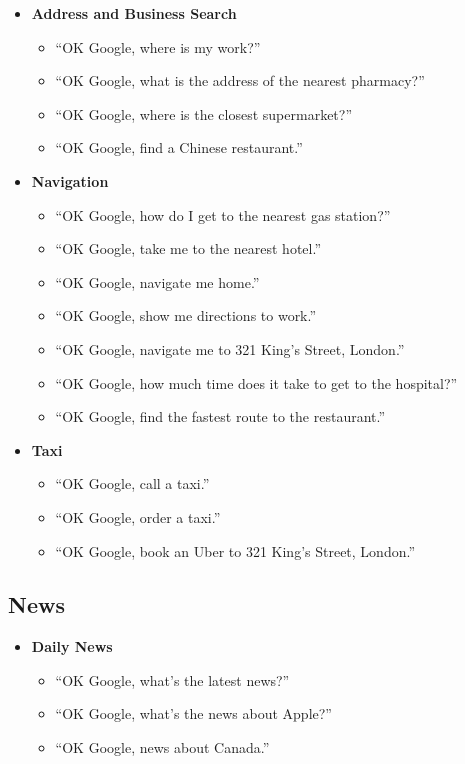 \documentclass[
  jou,
  floatsintext,
  longtable,
  a4paper,
  nolmodern,
  notxfonts,
  notimes,
  12pt,
  colorlinks=true,linkcolor=blue,citecolor=blue,urlcolor=blue]{apa7}
\providecommand{\tightlist}{%
  \setlength{\itemsep}{0pt}\setlength{\parskip}{0pt}}
\begin{document}
\begin{itemize}
\tightlist
\item
  \textbf{Address and Business Search}

  \begin{itemize}
  \tightlist
  \item
    ``OK Google, where is my work?''
  \item
    ``OK Google, what is the address of the nearest pharmacy?''
  \item
    ``OK Google, where is the closest supermarket?''
  \item
    ``OK Google, find a Chinese restaurant.''
  \end{itemize}
\item
  \textbf{Navigation}

  \begin{itemize}
  \tightlist
  \item
    ``OK Google, how do I get to the nearest gas station?''
  \item
    ``OK Google, take me to the nearest hotel.''
  \item
    ``OK Google, navigate me home.''
  \item
    ``OK Google, show me directions to work.''
  \item
    ``OK Google, navigate me to 321 King's Street, London.''
  \item
    ``OK Google, how much time does it take to get to the hospital?''
  \item
    ``OK Google, find the fastest route to the restaurant.''
  \end{itemize}
\item
  \textbf{Taxi}

  \begin{itemize}
  \tightlist
  \item
    ``OK Google, call a taxi.''
  \item
    ``OK Google, order a taxi.''
  \item
    ``OK Google, book an Uber to 321 King's Street, London.''
  \end{itemize}
\end{itemize}

\subsection{News}\label{news}

\begin{itemize}
\tightlist
\item
  \textbf{Daily News}

  \begin{itemize}
  \tightlist
  \item
    ``OK Google, what's the latest news?''
  \item
    ``OK Google, what's the news about Apple?''
  \item
    ``OK Google, news about Canada.''
  \end{itemize}
\end{itemize}
\end{document}
